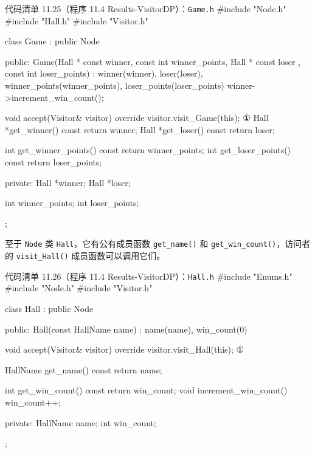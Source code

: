 \begin{codeboxt}{代码清单 11.25（程序 11.4 Results-VisitorDP）：\texttt{Game.h}}
#include "Node.h"
#include "Hall.h"
#include "Visitor.h"

class Game : public Node
{
public:
    Game(Hall * const winner, const int winner_points,
         Hall * const loser , const int loser_points)
        : winner(winner), loser(loser),
          winner_points(winner_points),
          loser_points(loser_points)
    {
        winner->increment_win_count();
    }

    void accept(Visitor& visitor) override
    {
        visitor.visit_Game(this);  ①
    }
    Hall *get_winner() const { return winner; }
    Hall *get_loser()  const { return loser;  }

    int get_winner_points() const { return winner_points; }
    int get_loser_points()  const { return  loser_points; }

private:
    Hall *winner;
    Hall *loser;

    int winner_points;
    int loser_points;
};
\end{codeboxt}
\par


至于 \texttt{Node} 类 \texttt{Hall}，它有公有成员函数 \texttt{get\_\allowbreak{}name(\allowbreak{})\allowbreak{}} 和 \texttt{get\_\allowbreak{}win\_\allowbreak{}count(\allowbreak{})\allowbreak{}}，访问者的 \texttt{visit\_\allowbreak{}Hall(\allowbreak{})\allowbreak{}} 成员函数可以调用它们。

\begin{codeboxt}{代码清单 11.26（程序 11.4 Results-VisitorDP）：\texttt{Hall.h}}
#include "Enums.h"
#include "Node.h"
#include "Visitor.h"

class Hall : public Node
{
public:
    Hall(const HallName name) : name(name), win_count(0) {}

    void accept(Visitor& visitor) override
    {
        visitor.visit_Hall(this);          ①
    }

    HallName get_name() const { return name; }

    int get_win_count() const  { return win_count; }
    void increment_win_count() { win_count++; }

private:
    HallName name;
    int win_count;
};
\end{codeboxt}
\par

